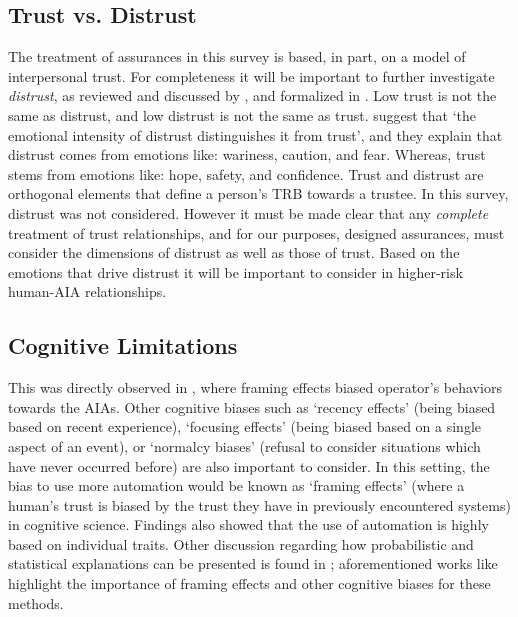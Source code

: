 \subsection{Trust vs. Distrust}
The treatment of assurances in this survey is based, in part, on a model of interpersonal trust. For completeness it will be important to further investigate \textit{distrust}, as reviewed and discussed by \citet{Lewicki1998-ox}, and formalized in \citet{McKnight2001-gz}. Low trust is not the same as distrust, and low distrust is not the same as trust. \citet{McKnight2001-gz} suggest that `the emotional intensity of distrust distinguishes it from trust', and they explain that distrust comes from emotions like: wariness, caution, and fear. Whereas, trust stems from emotions like: hope, safety, and confidence. Trust and distrust are orthogonal elements that define a person's TRB towards a trustee. In this survey, distrust was not considered. However it must be made clear that any \emph{complete} treatment of trust relationships, and for our purposes, designed assurances, must consider the dimensions of distrust as well as those of trust. Based on the emotions that drive distrust it will be important to consider in higher-risk human-AIA relationships.

\subsection{Cognitive Limitations}
This was directly observed in \cite{Freedy2007-sg,Riley1996-qm}, where framing effects biased operator's behaviors towards the AIAs. 
Other cognitive biases such as `recency effects' (being biased based on recent experience), `focusing effects' (being biased based on a single aspect of an event), or `normalcy biases' (refusal to consider situations which have never occurred before) are also important to consider. 
\citet{Riley1996-qm}In this setting, the bias to use more automation would be known as `framing effects' (where a human's trust is biased by the trust they have in previously encountered systems) in cognitive science. Findings also showed that the use of automation is highly based on individual traits.
Other discussion regarding how probabilistic and statistical explanations can be presented is found in \cite{Rouse1986-dz,Wallace2001-fm,Kuhn1997-qc,Lomas2012-ie,Swartout1983-ko}; 
aforementioned works like \cite{Kuhn1997-qc} highlight the importance of framing effects and other cognitive biases for these methods. 



